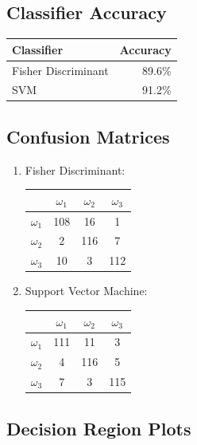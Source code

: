 \documentclass[a4paper]{article}
\begin{document}
\subsection{Classifier Accuracy}

\begin{tabular}{ | l | r | }
\hline
\textbf{Classifier} & \textbf{Accuracy} \\
\hline
Fisher Discriminant  &   89.6\% \\
\hline
SVM          &   91.2\% \\
\hline

\end{tabular}

\subsection{Confusion Matrices}

\begin{multicols}{2}
\begin{enumerate}
\item Fisher Discriminant:

\begin{tabular}{ | l | c | c | c | }
\hline
& $\omega_1$ & $\omega_2$ & $\omega_3$ \\
\hline
  $\omega_1$ & 108 & 16 & 1 \\
\hline
  $\omega_2$ & 2 & 116 & 7 \\
\hline
  $\omega_3$ & 10 & 3 & 112 \\
\hline
\end{tabular}

\item Support Vector Machine:

\begin{tabular}{ | l | c | c | c | }
\hline
& $\omega_1$ & $\omega_2$ & $\omega_3$ \\
\hline
  $\omega_1$ & 111 & 11 & 3 \\
\hline
  $\omega_2$ & 4 & 116 & 5 \\
\hline
  $\omega_3$ & 7 & 3 & 115 \\
\hline
\end{tabular}

\end{enumerate}
\end{multicols}

\subsection{Decision Region Plots}
\end{document}
